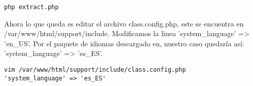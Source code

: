 \begin{lstlisting} 
php extract.php
\end{lstlisting}
Ahora lo que queda es editar el archivo class.config.php, este se encuentra en /var/www/html/support/include. Modificamos la linea  'system\_language' =>  'en\_US'. Por el paquete de idiomas descargado en, nuestro caso quedaría así:  'system\_language' =>  'es\_ES'.
\begin{lstlisting} 
vim /var/www/html/support/include/class.config.php
'system_language' => 'es_ES'
\end{lstlisting}
